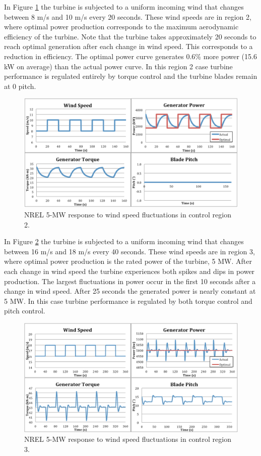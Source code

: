 In Figure \ref{fig3-3} the turbine is subjected to a uniform incoming wind that changes between 8 m/s and 10 m/s every 20 seconds. These wind speeds are in region 2, where optimal power production corresponds to the maximum aerodynamic efficiency of the turbine. Note that the turbine takes approximately 20 seconds to reach optimal generation after each change in wind speed. This corresponds to a reduction in efficiency.  The optimal power curve generates 0.6\% more power (15.6 kW on average) than the actual power curve. In this region 2 case turbine performance is regulated entirely by torque control and the turbine blades remain at 0\degree{} pitch. 

\begin{figure}[htbp]
	\centering
		\includegraphics[width=\linewidth]{Figures/ch3Figures/fig3-3.png}
		
	\caption{NREL 5-MW response to wind speed fluctuations in control region 2.}
	\label{fig3-3}
\end{figure}

In Figure \ref{fig3-4} the turbine is subjected to a uniform incoming wind that changes between 16 m/s and 18 m/s every 40 seconds. These wind speeds are in region 3, where optimal power production is the rated power of the turbine, 5 MW. After each change in wind speed the turbine experiences both spikes and dips in power production.  The largest fluctuations in power occur in the first 10 seconds after a change in wind speed. After 25 seconds the generated power is nearly constant at 5 MW.  In this case turbine performance is regulated by both torque control and pitch control. 

\begin{figure}[htb]
	\centering
		\includegraphics[width=\linewidth]{Figures/ch3Figures/fig3-4.png}
		
	\caption{NREL 5-MW response to wind speed fluctuations in control region 3.}
	\label{fig3-4}
\end{figure}

